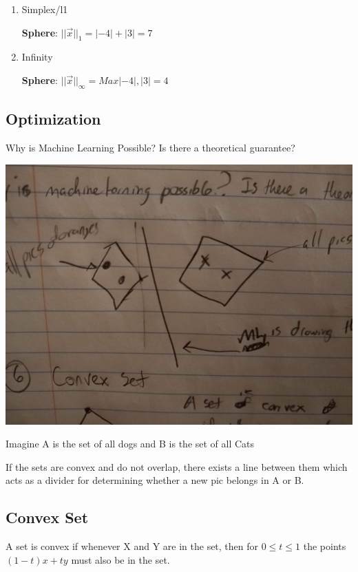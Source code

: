 \documentclass[11pt]{article}
\begin{document}
\begin{enumerate}
\item Simplex/l1
\label{sec:org035a783}

\textbf{Sphere}: \(||\vec{x}||_1 = |-4| + |3| = 7\)

\item Infinity
\label{sec:org7defd09}

\textbf{Sphere}: \(||\vec{x}||_\infty = Max{|-4|, |3|} = 4\)
\end{enumerate}
\subsection{Optimization}
\label{sec:org5e91cad}

Why is Machine Learning Possible? Is there a theoretical guarantee?

\begin{center}
\includegraphics[width=.9\linewidth]{./resources/convex2.jpg}
\end{center}

Imagine A is the set of all dogs and B is the set of all Cats

If the sets are convex and do not overlap, there exists a line between them
which acts as a divider for determining whether a new pic belongs in A or B.

\subsection{Convex Set}
\label{sec:org2c8cab6}

A set is convex if whenever X and Y are in the set, then for \(0 \leq t \leq 1\)
the points \((1 - t)x + ty\) must also be in the set.
\end{document}

